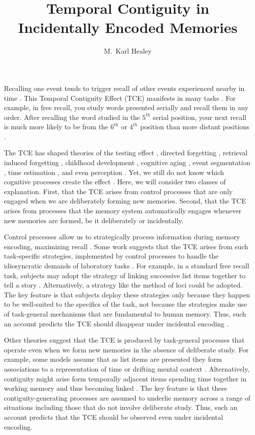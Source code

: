 \documentclass[jou,natbib,floatsintext]{apa6} %
\title{Temporal Contiguity in Incidentally Encoded Memories}
\author{M.\ Karl Healey}
\affiliation{Michigan State University}
\begin{document}
\maketitle
Recalling one event tends to trigger recall of other events experienced nearby in time \citep{HealKaha17}. This Temporal Contiguity Effect (TCE) manifests in many tasks \citep{DaviEtal08,SchwEtal05}. For example, in free recall, you study words presented serially and recall them in any order. After recalling the word studied in the $5^{th}$ serial position, your next recall is much more likely to be from the $6^{th}$ or $4^{th}$ position than more distant positions \citep{Kaha96}. \label{TODO-1}

The TCE has shaped theories of the testing effect \citep{KarpEtal14}, directed forgetting \citep{SahaEtal13}, retrieval induced forgetting \citep{KlieBaum16}, childhood development \citep{JarroEtal15}, cognitive aging \citep{WahlHuff15,HealKaha15}, event segmentation \citep{EzzyDava14}, time estimation \citep{SahaSmit13}, and even perception \citep{TurkEtal12}. Yet, we still do not know which cognitive processes create the effect \citep{HealKaha17}. Here, we will consider two classes of explanation. First, that the TCE arises from control processes that are only engaged when we are deliberately forming new memories. Second, that the TCE arises from processes that the memory system automatically engages whenever new memories are formed, be it deliberately or incidentally. \label{TODO-2}   

Control processes \citep{LehmMalm13,AtkiShif68} allow us to strategically process information during memory encoding, maximizing recall \citep[e.g.,][]{Unsw16,DelaKnow05}. Some work suggests that the TCE arises from such task-specific strategies, implemented by control processes to handle the idiosyncratic demands of laboratory tasks \citep{Hint16}. For example, in a standard free recall task, subjects may adopt the strategy of linking successive list items together to tell a story \citep{DelaKnow05}. Alternatively, a strategy like the method of loci could be adopted. The key feature is that subjects deploy these strategies only because they happen to be well-suited to the specifics of the task, not because the strategies make use of task-general mechanisms that are fundamental to human memory. Thus, such an account predicts the TCE should disappear under incidental encoding \citep{Hint16}.

Other theories suggest that the TCE is produced by task-general processes that operate even when we form new memories in the absence of deliberate study. For example, some models assume that as list items are presented they form associations to a representation of time \citep{HowaEtal14a,BrowEtal07} or drifting mental context \citep{LohnEtal14}. Alternatively, contiguity might arise form temporally adjacent items spending time together in working memory and thus becoming linked \citep{LehmMalm13}. The key feature is that these contiguity-generating processes are assumed to underlie memory across a range of situations including those that do not involve deliberate study. Thus, such an account  predicts that the TCE should be observed even under incidental encoding.
\end{document}
